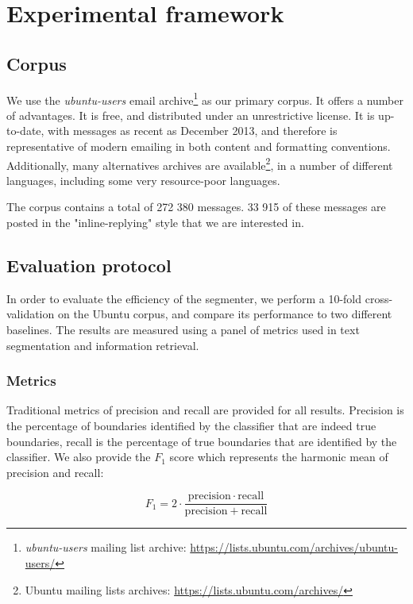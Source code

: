 
\section{Experimental framework}

\subsection{Corpus}

We use the \textit{ubuntu-users} email archive\footnote{\textit{ubuntu-users} mailing list archive: \url{https://lists.ubuntu.com/archives/ubuntu-users/}} as our primary corpus. It offers a number of advantages. It is free, and distributed under an unrestrictive license. It is up-to-date, with messages as recent as December 2013, and therefore is representative of modern emailing in both content and formatting conventions. Additionally, many alternatives archives are available\footnote{Ubuntu mailing lists archives: \url{https://lists.ubuntu.com/archives/}}, in a number of different languages, including some very resource-poor languages.

The corpus contains a total of 272 380 messages. 33 915 of these messages are posted in the "inline-replying" style that we are interested in.

\subsection{Evaluation protocol}

In order to evaluate the efficiency of the segmenter, we perform a 10-fold cross-validation on the Ubuntu corpus, and compare its performance to two different baselines. The results are measured using a panel of metrics used in text segmentation and information retrieval.

\subsubsection{Metrics}

Traditional metrics of precision and recall are provided for all results. Precision is the percentage of boundaries identified by the classifier that are indeed true boundaries, recall is the percentage of true boundaries that are identified by the classifier. We also provide the $F_1$ score which represents the harmonic mean of precision and recall:

\[
    F_1 = 2 \cdot \frac{\mathrm{precision} \cdot \mathrm{recall}}{\mathrm{precision} + \mathrm{recall}}
\]

